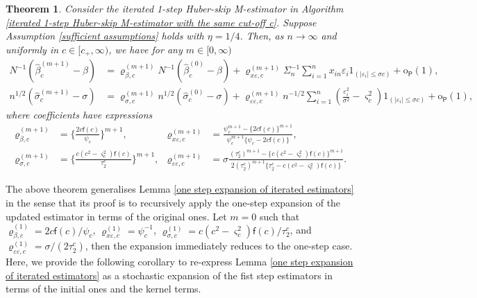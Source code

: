 \documentclass[11pt, letterpaper]{article}
\newtheorem{theorem}{Theorem}
\numberwithin{algorithm}{section}
\numberwithin{assumption}{section}
\numberwithin{lemma}{section}
\numberwithin{theorem}{section}
\numberwithin{corollary}{section}
\numberwithin{remark}{section}
\numberwithin{equation}{section}
\numberwithin{figure}{section}
\numberwithin{table}{section}
\begin{document}
\begin{theorem} \label{general expansion in terms of initial estimators}
Consider the iterated 1-step Huber-skip M-estimator in Algorithm \ref{iterated 1-step Huber-skip M-estimator with the same cut-off c}. Suppose Assumption \ref{sufficient assumptions} holds with $\eta = 1/4$. Then, as $n \to \infty$ and uniformly in $c \in [c_{+}, \infty)$, we have for any $m \in [0, \infty)$
\begin{align*}
N^{-1} (\widehat{\beta}_{c}^{(m + 1)} - \beta) & = \varrho_{\beta, c}^{(m + 1)} N^{-1} (\widehat{\beta}_{c}^{(0)} - \beta) + \varrho_{x \varepsilon, c}^{(m + 1)} \Sigma_{n}^{-1} \sum_{i = 1}^{n} x_{in} \varepsilon_{i} 1_{(|\varepsilon_{i}| \le \sigma c)} +  \mathrm{o}_{\mathsf{P}}(1), \\
n^{1/2} (\widehat{\sigma}_{c}^{(m + 1)} - \sigma) & = \varrho_{\sigma, c}^{(m + 1)} n^{1/2} (\widehat{\sigma}_{c}^{(0)} - \sigma) + \varrho_{\varepsilon \varepsilon, c}^{(m + 1)} n^{-1/2} \sum_{i=1}^{n} (\frac{\varepsilon_{i}^{2}}{\sigma^{2}} - \varsigma_{c}^{2}) 1_{(|\varepsilon_{i}| \le \sigma c)} +  \mathrm{o}_{\mathsf{P}}(1),
\end{align*}
where coefficients have expressions
\begin{align*}
\varrho_{\beta, c}^{(m + 1)} & = \{ \frac{2 c \mathsf{f}(c)}{\psi_{c}} \}^{m + 1},  & \varrho_{x \varepsilon, c}^{(m + 1)} & = \frac{\psi_{c}^{m + 1} - \{ 2 c \mathsf{f}(c) \}^{m + 1}}{\psi_{c}^{m + 1} \{ \psi_{c} - 2 c \mathsf{f}(c) \}}, \\
\varrho_{\sigma, c}^{(m + 1)} & = \{ \frac{c (c^{2} - \varsigma_{c}^{2}) \mathsf{f}(c)}{\tau_{2}^{c}} \}^{m + 1} , & \varrho_{\varepsilon \varepsilon, c}^{(m + 1)} & = \sigma \frac{(\tau_{2}^{c})^{m + 1} - \{ c (c^{2} - \varsigma_{c}^{2}) \mathsf{f}(c) \}^{m + 1}}{2 (\tau_{2}^{c})^{m + 1} \{ \tau_{2}^{c} - c (c^{2} - \varsigma_{c}^{2}) \mathsf{f}(c) \}}.
\end{align*}
\end{theorem}

The above theorem generalises Lemma \ref{one step expansion of iterated estimators} in the sense that its proof is to recursively apply the one-step expansion of the updated estimator in terms of the original ones. Let $m = 0$ such that $\varrho_{\beta, c}^{(1)} = 2 c \mathsf{f}(c) / \psi_{c}$, $\varrho_{x \varepsilon, c}^{(1)}  = \psi_{c}^{-1}$, $\varrho_{\sigma, c}^{(1)} = c (c^{2} - \varsigma_{c}^{2}) \mathsf{f}(c) / \tau_{2}^{c}$, and $\varrho_{\varepsilon \varepsilon, c}^{(1)} = \sigma / (2 \tau_{2}^{c})$, then the expansion immediately reduces to the one-step case. Here, we provide the following corollary to re-express Lemma \ref{one step expansion of iterated estimators} as a stochastic expansion of the fist step estimators in terms of the initial ones and the kernel terms.
\end{document}
